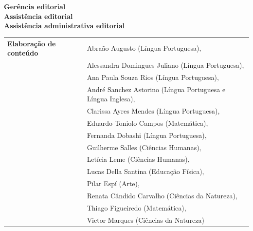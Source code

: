 \newcommand{\linha}[2]{\ifdef{#2}{\linhalayout{#1}{#2}}{}}

\begingroup\tiny
\parindent=0cm
\thispagestyle{empty}

\textbf{Gerência editorial}\\
\textbf{Assistência editorial}\\
\textbf{Assistência administrativa editorial}\\


\hspace{-5pt}\begin{tabular}{ll}
\textbf{Elaboração de conteúdo} & Abraão Augusto (Língua Portuguesa),	\\
								& Alessandra Domingues Juliano (Língua Portuguesa),	\\
								& Ana Paula Souza Rios (Língua Portuguesa),	\\
								& André Sanchez Astorino (Língua Portuguesa e Língua Inglesa),	\\
								& Clarissa Ayres Mendes (Língua Portuguesa),	\\
								& Eduardo Toniolo Campos (Matemática),	\\
								& Fernanda Dobashi (Língua Portuguesa),	\\
								& Guilherme Salles (Ciências Humanas),	\\
								& Letícia Leme (Ciências Humanas),	\\
								& Lucas Della Santina (Educação Física),	\\
								& Pilar Espí (Arte),	\\
								& Renata Cândido Carvalho (Ciências da Natureza),	\\
								& Thiago Figueiredo (Matemática),	\\
								& Victor Marques (Ciências da Natureza)	\\
\end{tabular}


